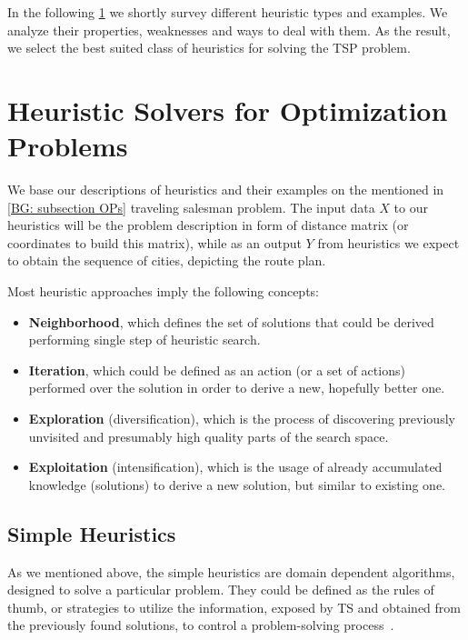 In the following \cref{bg: section heuristics} we shortly survey different heuristic types and examples. We analyze their properties, weaknesses and ways to deal with them. As the result, we select the best suited class of heuristics for solving the TSP problem.

\section{Heuristic Solvers for Optimization Problems}\label{bg: section heuristics}
We base our descriptions of heuristics and their examples on the mentioned in \cref{BG: subsection OPs} traveling salesman problem. The input data $X$ to our heuristics will be the problem description in form of distance matrix (or coordinates to build this matrix), while as an output $Y$ from heuristics we expect to obtain the sequence of cities, depicting the route plan.


Most heuristic approaches imply the following concepts:
\begin{itemize}
	\item \textbf{Neighborhood}, which defines the set of solutions that could be derived performing single step of heuristic search.
	\item \textbf{Iteration}, which could be defined as an action (or a set of actions) performed over the solution in order to derive a new, hopefully better one.
	\item \textbf{Exploration} (diversification), which is the process of discovering previously unvisited and presumably high quality parts of the search space.
	\item \textbf{Exploitation} (intensification), which is the usage of already accumulated knowledge (solutions) to derive a new solution, but similar to existing one.
\end{itemize}


\subsection{Simple Heuristics}
As we mentioned above, the simple heuristics are domain dependent algorithms, designed to solve a particular problem.
They could be defined as the rules of thumb, or strategies to utilize the information, exposed by TS and obtained from the previously found solutions, to control a problem-solving process~\cite{pearl1984intelligent}. 

